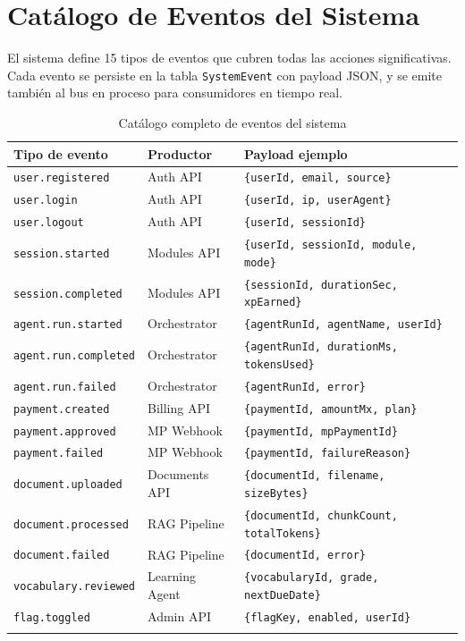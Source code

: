 \chapter{Catálogo de Eventos del Sistema}
\label{app:events-catalog}

El sistema define 15 tipos de eventos que cubren todas las acciones significativas. Cada evento se persiste en la tabla \texttt{SystemEvent} con payload JSON, y se emite también al bus en proceso para consumidores en tiempo real.

\begin{longtable}{p{3.5cm}p{3cm}p{6.5cm}}
\toprule
\textbf{Tipo de evento} & \textbf{Productor} & \textbf{Payload ejemplo} \\
\midrule
\endhead
\texttt{user.registered} & Auth API & \texttt{\{userId, email, source\}} \\
\texttt{user.login} & Auth API & \texttt{\{userId, ip, userAgent\}} \\
\texttt{user.logout} & Auth API & \texttt{\{userId, sessionId\}} \\
\texttt{session.started} & Modules API & \texttt{\{userId, sessionId, module, mode\}} \\
\texttt{session.completed} & Modules API & \texttt{\{sessionId, durationSec, xpEarned\}} \\
\texttt{agent.run.started} & Orchestrator & \texttt{\{agentRunId, agentName, userId\}} \\
\texttt{agent.run.completed} & Orchestrator & \texttt{\{agentRunId, durationMs, tokensUsed\}} \\
\texttt{agent.run.failed} & Orchestrator & \texttt{\{agentRunId, error\}} \\
\texttt{payment.created} & Billing API & \texttt{\{paymentId, amountMx, plan\}} \\
\texttt{payment.approved} & MP Webhook & \texttt{\{paymentId, mpPaymentId\}} \\
\texttt{payment.failed} & MP Webhook & \texttt{\{paymentId, failureReason\}} \\
\texttt{document.uploaded} & Documents API & \texttt{\{documentId, filename, sizeBytes\}} \\
\texttt{document.processed} & RAG Pipeline & \texttt{\{documentId, chunkCount, totalTokens\}} \\
\texttt{document.failed} & RAG Pipeline & \texttt{\{documentId, error\}} \\
\texttt{vocabulary.reviewed} & Learning Agent & \texttt{\{vocabularyId, grade, nextDueDate\}} \\
\texttt{flag.toggled} & Admin API & \texttt{\{flagKey, enabled, userId\}} \\
\bottomrule
\caption{Catálogo completo de eventos del sistema}
\end{longtable}

